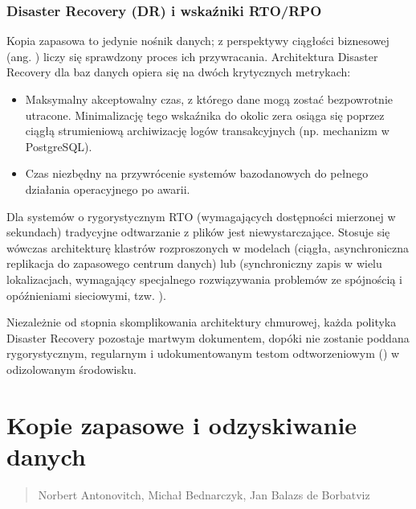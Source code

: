 \documentclass[letterpaper,10pt,polish]{sphinxmanual}
\begin{document}
\subsubsection{Disaster Recovery (DR) i wskaźniki RTO/RPO}
\label{\detokenize{rozdzia_u0142_2/rozdzia_u0142_27/rozdzial_6:disaster-recovery-dr-i-wskazniki-rto-rpo}}
\sphinxAtStartPar
Kopia zapasowa to jedynie nośnik danych; z perspektywy ciągłości biznesowej (ang. ) liczy się sprawdzony proces ich przywracania. Architektura Disaster Recovery dla baz danych opiera się na dwóch krytycznych metrykach:
\begin{itemize}
\item {} 
\sphinxAtStartPar
{} Maksymalny akceptowalny czas, z którego dane mogą zostać bezpowrotnie utracone. Minimalizację tego wskaźnika do okolic zera osiąga się poprzez ciągłą strumieniową archiwizację logów transakcyjnych (np. mechanizm  w PostgreSQL).

\item {} 
\sphinxAtStartPar
{} Czas niezbędny na przywrócenie systemów bazodanowych do pełnego działania operacyjnego po awarii.

\end{itemize}

\sphinxAtStartPar
Dla systemów o rygorystycznym RTO (wymagających dostępności mierzonej w sekundach) tradycyjne odtwarzanie z plików jest niewystarczające. Stosuje się wówczas architekturę klastrów rozproszonych w modelach  (ciągła, asynchroniczna replikacja do zapasowego centrum danych) lub  (synchroniczny zapis w wielu lokalizacjach, wymagający specjalnego rozwiązywania problemów ze spójnością i opóźnieniami sieciowymi, tzw. ).

\sphinxAtStartPar
Niezależnie od stopnia skomplikowania architektury chmurowej, każda polityka Disaster Recovery pozostaje martwym dokumentem, dopóki nie zostanie poddana rygorystycznym, regularnym i udokumentowanym testom odtworzeniowym () w odizolowanym środowisku.

\sphinxstepscope


\section{Kopie zapasowe i odzyskiwanie danych}
\label{\detokenize{rozdzia_u0142_2/rozdzia_u0142_28/index:kopie-zapasowe-i-odzyskiwanie-danych}}\label{\detokenize{rozdzia_u0142_2/rozdzia_u0142_28/index::doc}}\begin{quote}\begin{description}
\sphinxAtStartPar
Norbert Antonovitch, Michał Bednarczyk, Jan Balazs de Borbatviz

\end{description}\end{quote}
\end{document}
